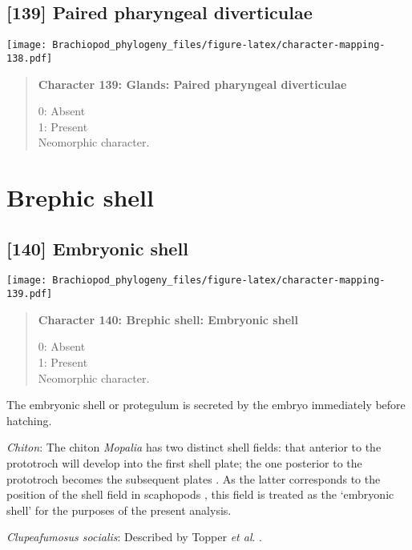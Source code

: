 \documentclass[openany]{book}
\theoremstyle{definition}
\theoremstyle{definition}
\theoremstyle{definition}
\theoremstyle{remark}
\begin{document}
\subsection*{{[}139{]} Paired pharyngeal
diverticulae}\label{paired-pharyngeal-diverticulae}

\texttt{[image: Brachiopod\_phylogeny\_files/figure-latex/character-mapping-138.pdf]}

\begin{quote}
\textbf{Character 139: Glands: Paired pharyngeal diverticulae}

0: Absent\\
1: Present\\
Neomorphic character.
\end{quote}

\section{Brephic shell}\label{brephic-shell}

\subsection*{{[}140{]} Embryonic shell}\label{embryonic-shell}

\texttt{[image: Brachiopod\_phylogeny\_files/figure-latex/character-mapping-139.pdf]}

\begin{quote}
\textbf{Character 140: Brephic shell: Embryonic shell}

0: Absent\\
1: Present\\
Neomorphic character.
\end{quote}

The embryonic shell or protegulum is secreted by the embryo immediately
before hatching.

\hypertarget{Chiton-coding-140}{}
\emph{Chiton}: The chiton \emph{Mopalia} has two distinct shell fields:
that anterior to the prototroch will develop into the first shell plate;
the one posterior to the prototroch becomes the subsequent plates
\citep{Wanninger2002C}. As the latter corresponds to the position of the
shell field in scaphopods \citep{Wanninger2001}, this field is treated
as the `embryonic shell' for the purposes of the present analysis.

\hypertarget{Clupeafumosus_socialis-coding-140}{}
\emph{Clupeafumosus socialis}: Described by Topper \emph{et al}.
\citeyearpar{Topper2013Reappraisalof}.
\end{document}
